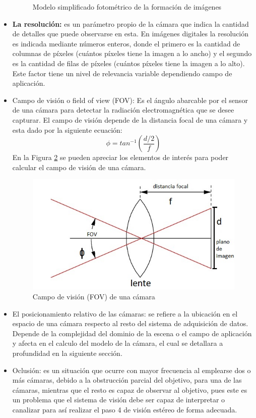 \begin{itemize}
\begin{figure}[H]
        \caption{Modelo simplificado fotométrico de la formación de imágenes}
        \label{photometry}
    \end{figure}
    \item \textbf{La resolución:} es un parámetro propio de la cámara que indica la cantidad de detalles que puede observarse en esta. En imágenes digitales la resolución es indicada mediante números enteros, donde el primero es la cantidad de columnas de píxeles (cuántos píxeles tiene la imagen a lo ancho) y el segundo es la cantidad de filas de píxeles (cuántos píxeles tiene la imagen a lo alto). Este factor tiene un nivel de relevancia variable dependiendo  campo de aplicación.
    \item Campo de visión o field of view (FOV): Es el ángulo abarcable por el sensor de una cámara para detectar la radiación electromagnética que se desee capturar. El campo de visión depende de la distancia focal de una cámara y esta dado por la siguiente ecuación:
    \begin{equation}
        \phi = tan^{-1}\left(\frac{d/2}{f}\right)
    \end{equation}
    En la Figura \ref{FOV} se pueden apreciar los elementos de interés para poder calcular el campo de visión de una cámara.
    \begin{figure}[H]
        \centering
        \includegraphics{Recursos/FOV.jpg}
        \caption{Campo de visión (FOV) de una cámara}
        \label{FOV}
    \end{figure}
    \item El posicionamiento relativo de las cámaras: se refiere a la ubicación en el espacio de una cámara respecto al resto del sistema de adquisición de datos. Depende de la complejidad del dominio de la escena o el campo de aplicación y afecta en el calculo del modelo de la cámara, el cual se detallara a profundidad en la siguiente sección.
    \item Oclusión: es un situación que ocurre con mayor frecuencia al emplearse dos o más cámaras, debido a la obstrucción parcial del objetivo, para una de las cámaras, mientras que el resto es capaz de observar al objetivo, pues este es un problema que el sistema de visión debe ser capaz de interpretar o canalizar para así realizar el paso 4 de visión estéreo de forma adecuada.
\end{itemize}
